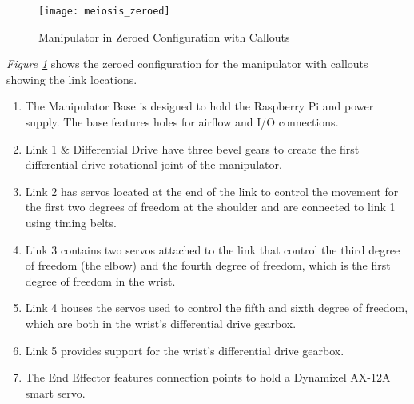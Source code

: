 \begin{figure}[htp]
  \center
  \texttt{[image: meiosis\_zeroed]}
  \caption{Manipulator in Zeroed Configuration with Callouts}
  \label{fig:meiosis_zeroed}
\end{figure}
\emph{Figure \ref{fig:meiosis_zeroed}} shows the zeroed configuration for the manipulator with callouts showing the link locations.
\begin{enumerate}[label=\alph*.]
  \item The {Manipulator Base} is designed to hold the Raspberry Pi and power supply. The base features holes for airflow and I/O connections.
  \item {Link 1 \& Differential Drive} have three bevel gears to create the first differential drive rotational joint of the manipulator.
  \item {Link 2} has servos located at the end of the link to control the movement for the first two degrees of freedom at the shoulder and are connected to link 1 using timing belts.
  \item {Link 3} contains two servos attached to the link that control the third degree of freedom (the elbow) and the fourth degree of freedom, which is the first degree of freedom in the wrist.
  \item {Link 4 }houses the servos used to control the fifth and sixth degree of freedom, which are both in the wrist’s differential drive gearbox.
  \item {Link 5} provides support for the wrist’s differential drive gearbox.
  \item The {End Effector} features connection points to hold a Dynamixel AX-12A smart servo.
\end{enumerate}


